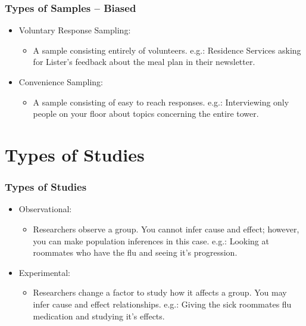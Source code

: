 \documentclass{beamer}
\begin{document}
    \begin{frame}
        \frametitle{Types of Samples -- Biased}
        \begin{itemize}
            \item Voluntary Response Sampling:
            \begin{itemize}
                \item[] A sample consisting entirely of volunteers. \newline
                e.g.: Residence Services asking for Lister's feedback about the meal plan in their newsletter. 
                \newline
            \end{itemize}
            \item Convenience Sampling:
            \begin{itemize}
                \item[] A sample consisting of easy to reach responses. \newline
                e.g.: Interviewing only people on your floor about topics concerning the entire tower.
            \end{itemize}
        \end{itemize}
    \end{frame}

    \section{Types of Studies}

    \begin{frame}
        \frametitle{Types of Studies}
        \begin{itemize}
            \item Observational:
            \begin{itemize}
                \item[] Researchers observe a group. You cannot infer cause and effect; however, you can
                make population inferences in this case. \newline
                e.g.: Looking at roommates who have the flu and seeing it's progression. \newline \pause
            \end{itemize}
            \item Experimental:
            \begin{itemize}
                \item[] Researchers change a factor to study how it affects a group. You may infer cause 
                and effect relationships. \newline
                e.g.: Giving the sick roommates flu medication and studying it's effects.
            \end{itemize}
        \end{itemize}
    \end{frame}
\end{document}
